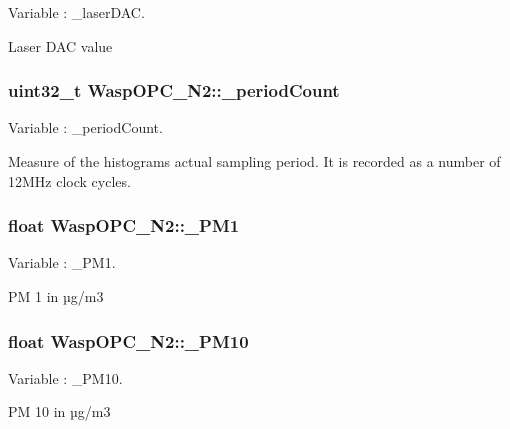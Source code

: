 Variable \+: \+\_\+laser\+D\+AC. 

Laser D\+AC value 
\subsubsection[{\texorpdfstring{\+\_\+period\+Count}{_periodCount}}]{\setlength{\rightskip}{0pt plus 5cm}uint32\+\_\+t Wasp\+O\+P\+C\+\_\+\+N2\+::\+\_\+period\+Count}\hypertarget{class_wasp_o_p_c___n2_a869484eaea2d0a63a403edf08c8cc894}{}\label{class_wasp_o_p_c___n2_a869484eaea2d0a63a403edf08c8cc894}


Variable \+: \+\_\+period\+Count. 

Measure of the histogram\textquotesingle{}s actual sampling period. It is recorded as a number of 12\+M\+Hz clock cycles. 
\subsubsection[{\texorpdfstring{\+\_\+\+P\+M1}{_PM1}}]{\setlength{\rightskip}{0pt plus 5cm}float Wasp\+O\+P\+C\+\_\+\+N2\+::\+\_\+\+P\+M1}\hypertarget{class_wasp_o_p_c___n2_aab45afc9b5e75d5c14aa405ea90beb91}{}\label{class_wasp_o_p_c___n2_aab45afc9b5e75d5c14aa405ea90beb91}


Variable \+: \+\_\+\+P\+M1. 

PM 1 in µg/m3 
\subsubsection[{\texorpdfstring{\+\_\+\+P\+M10}{_PM10}}]{\setlength{\rightskip}{0pt plus 5cm}float Wasp\+O\+P\+C\+\_\+\+N2\+::\+\_\+\+P\+M10}\hypertarget{class_wasp_o_p_c___n2_a165a813a96afdbdeeaf506e877bf02c3}{}\label{class_wasp_o_p_c___n2_a165a813a96afdbdeeaf506e877bf02c3}


Variable \+: \+\_\+\+P\+M10. 

PM 10 in µg/m3 
